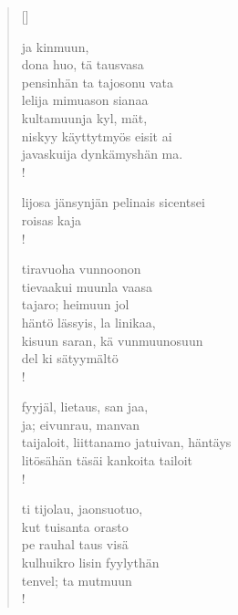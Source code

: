 \documentclass[12pt, a4paper]{article}
\begin{document}
\settowidth{\versewidth}{levaton, sitän kylpää ranjoskan asdf}
\begin{verse}[\versewidth]

ja kinmuun, \\
dona huo, tä tausvasa \\
pensinhän ta tajosonu vata \\
lelija mimuason sianaa \\
kultamuunja kyl, mät, \\
niskyy käyttytmyös eisit ai \\
javaskuija dynkämyshän ma. \\!



lijosa jänsynjän pelinais sicentsei \\
roisas kaja \\!



tiravuoha vunnoonon \\
tievaakui muunla vaasa \\
tajaro; heimuun jol \\
häntö lässyis, la linikaa, \\
kisuun saran, kä vunmuunosuun \\
del ki sätyymältö \\!



fyyjäl, lietaus, san jaa, \\
ja; eivunrau, manvan \\
taijaloit, liittanamo jatuivan, häntäys \\
litösähän täsäi kankoita tailoit \\!



ti tijolau, jaonsuotuo, \\
kut tuisanta orasto \\
pe rauhal taus visä \\
kulhuikro lisin fyylythän \\
tenvel; ta mutmuun \\!


\end{verse}
\newpage
\end{document}

